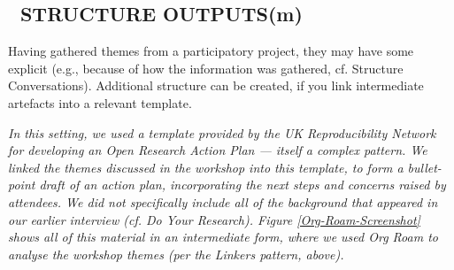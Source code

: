 \documentclass[acmlarge,timestamp]{acmart}
\newcommand{\motor}{(m)}
\begin{document}
\subsection*{💎 STRUCTURE OUTPUTS{\hfill\motor}}
Having gathered themes from a participatory project, they may have
some explicit (e.g., because of how the information was gathered,
cf. {\sc Structure Conversations}).  Additional structure can be
created, if you link intermediate artefacts into a relevant template.

\emph{In this setting, we used a template provided by the UK
Reproducibility Network for developing an Open Research Action Plan
\cite{orap-template} — itself a complex pattern.  We linked the themes
discussed in the workshop into this template, to form a bullet-point
draft of an action plan, incorporating the next steps and concerns
raised by attendees.  We did not specifically include all of the
background that appeared in our earlier interview (cf. {\sc Do Your
  Research}).  Figure \ref{Org-Roam-Screenshot} shows all of this
material in an intermediate form, where we used Org Roam to analyse
the workshop themes (per the {\sc Linkers} pattern, above).}



\end{document}
